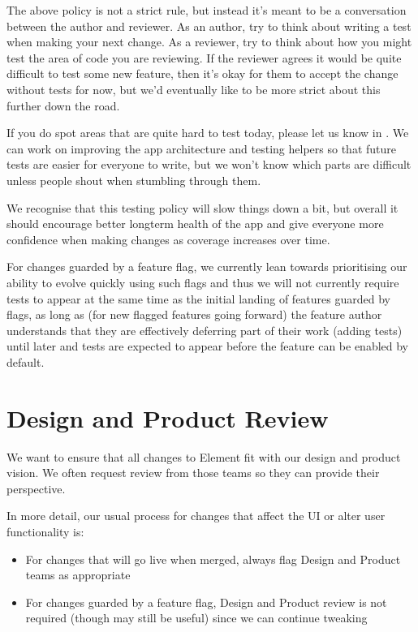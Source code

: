 \documentclass[letterpaper,10pt,openany,oneside,english]{sphinxmanual}
\begin{document}
\sphinxAtStartPar
The above policy is not a strict rule, but instead it’s meant to be a
conversation between the author and reviewer. As an author, try to think about
writing a test when making your next change. As a reviewer, try to think about
how you might test the area of code you are reviewing. If the reviewer agrees
it would be quite difficult to test some new feature, then it’s okay for them to
accept the change without tests for now, but we’d eventually like to be more
strict about this further down the road.

\sphinxAtStartPar
If you do spot areas that are quite hard to test today, please let us know in
. We can
work on improving the app architecture and testing helpers so that future tests
are easier for everyone to write, but we won’t know which parts are difficult
unless people shout when stumbling through them.

\sphinxAtStartPar
We recognise that this testing policy will slow things down a bit, but overall
it should encourage better long\sphinxhyphen{}term health of the app and give everyone more
confidence when making changes as coverage increases over time.

\sphinxAtStartPar
For changes guarded by a feature flag, we currently lean towards prioritising
our ability to evolve quickly using such flags and thus we will not currently
require tests to appear at the same time as the initial landing of features
guarded by flags, as long as (for new flagged features going forward) the
feature author understands that they are effectively deferring part of their
work (adding tests) until later and tests are expected to appear before the
feature can be enabled by default.


\chapter{Design and Product Review}
\label{\detokenize{review:design-and-product-review}}
\sphinxAtStartPar
We want to ensure that all changes to Element fit with our design and product
vision. We often request review from those teams so they can provide their
perspective.

\sphinxAtStartPar
In more detail, our usual process for changes that affect the UI or alter user
functionality is:
\begin{itemize}
\item {} 
\sphinxAtStartPar
For changes that will go live when merged, always flag Design and Product
teams as appropriate

\item {} 
\sphinxAtStartPar
For changes guarded by a feature flag, Design and Product review is not
required (though may still be useful) since we can continue tweaking

\end{itemize}
\end{document}
